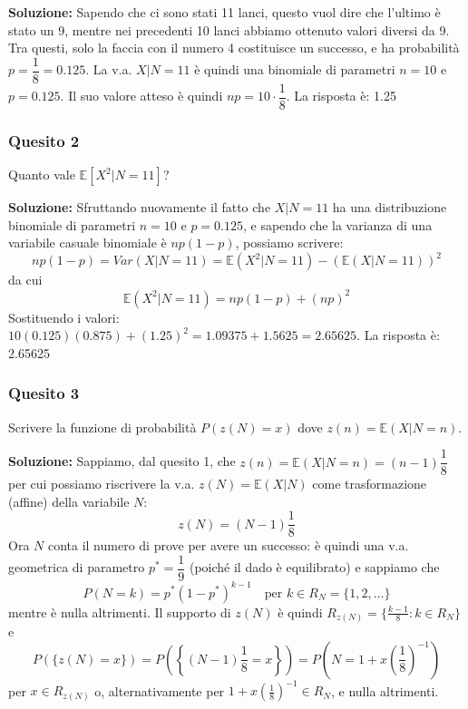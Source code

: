 \documentclass[12pt, a4paper]{article}
\begin{document}
\textbf{Soluzione:}
Sapendo che ci sono stati 11 lanci, questo vuol dire che l’ultimo è stato un 9, mentre nei precedenti 10 lanci abbiamo ottenuto valori diversi da 9. Tra questi, solo la faccia con il numero 4 costituisce un successo, e ha probabilità $p = \dfrac{1}{8} = 0.125$.
La v.a. $X|N=11$ è quindi una binomiale di parametri $n=10$ e $p=0.125$. Il suo valore atteso è quindi $np = 10 \cdot \dfrac{1}{8}$.
La risposta è: 1.25

\subsubsection*{Quesito 2}
Quanto vale $\mathbb{E}[X^2|N=11]$?

\textbf{Soluzione:}
Sfruttando nuovamente il fatto che $X|N=11$ ha una distribuzione binomiale di parametri $n=10$ e $p=0.125$, e sapendo che la varianza di una variabile casuale binomiale è $np(1-p)$, possiamo scrivere:
$$ np(1-p) = Var(X|N=11) = \mathbb{E}(X^2|N=11) - (\mathbb{E}(X|N=11))^2 $$
da cui
$$ \mathbb{E}(X^2|N=11) = np(1-p) + (np)^2 $$
Sostituendo i valori: $10(0.125)(0.875) + (1.25)^2 = 1.09375 + 1.5625 = 2.65625$.
La risposta è: 2.65625

\subsubsection*{Quesito 3}
Scrivere la funzione di probabilità $P(z(N)=x)$ dove $z(n)=\mathbb{E}(X|N=n)$.

\textbf{Soluzione:}
Sappiamo, dal quesito 1, che $z(n) = \mathbb{E}(X|N=n) = (n-1)\dfrac{1}{8}$ per cui possiamo riscrivere la v.a. $z(N) = \mathbb{E}(X|N)$ come trasformazione (affine) della variabile $N$:
$$ z(N) = (N-1)\frac{1}{8} $$
Ora $N$ conta il numero di prove per avere un successo: è quindi una v.a. geometrica di parametro $p^*=\dfrac{1}{9}$ (poiché il dado è equilibrato) e sappiamo che 
$$ P(N=k) = p^*(1-p^*)^{k-1} \quad \text{per } k \in R_N=\{1,2,\dots\} $$
mentre è nulla altrimenti. Il supporto di $z(N)$ è quindi $R_{z(N)} = \{ \frac{k-1}{8} : k \in R_N \}$ e 
$$ P(\{z(N)=x\}) = P\left(\left\{(N-1)\frac{1}{8}=x\right\}\right) = P\left(N = 1 + x\left(\frac{1}{8}\right)^{-1}\right) $$
per $x \in R_{z(N)}$ o, alternativamente per $1+x\left(\frac{1}{8}\right)^{-1} \in R_N$, e nulla altrimenti.
\end{document}
